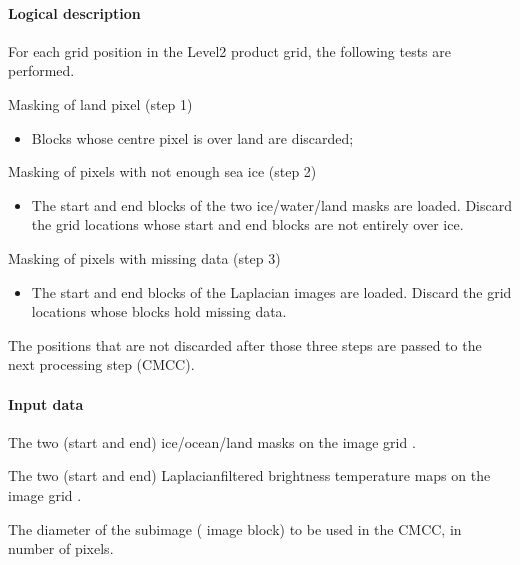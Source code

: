\documentclass[letterpaper,10pt,english]{jupyterBook}
\begin{document}
\paragraph{Logical description}
\label{\detokenize{baseline_algorithm_definition:logical-description}}
\sphinxAtStartPar
For each grid position in the Level\sphinxhyphen{}2 product grid, the following tests are performed.

\sphinxAtStartPar
Masking of land pixel (step 1)
\begin{itemize}
\item {} 
\sphinxAtStartPar
Blocks whose centre pixel is over land are discarded;

\end{itemize}

\sphinxAtStartPar
Masking of pixels with not enough sea ice (step 2)
\begin{itemize}
\item {} 
\sphinxAtStartPar
The start and end blocks of the two ice/water/land masks are loaded. Discard
the grid locations whose start and end blocks are not entirely over ice.

\end{itemize}

\sphinxAtStartPar
Masking of pixels with missing data (step 3)
\begin{itemize}
\item {} 
\sphinxAtStartPar
The start and end blocks of the Laplacian images are loaded.
Discard the grid locations whose blocks hold missing data.

\end{itemize}

\sphinxAtStartPar
The positions that are not discarded after those three steps are passed to the next processing step (CMCC).


\paragraph{Input data}
\label{\detokenize{baseline_algorithm_definition:id10}}
\sphinxAtStartPar
The two (start and end) ice/ocean/land masks on the image grid .

\sphinxAtStartPar
The two (start and end) Laplacian\sphinxhyphen{}filtered brightness temperature maps on the image grid .

\sphinxAtStartPar
The diameter of the sub\sphinxhyphen{}image ( image block) to be used in the CMCC, in number of pixels.
\end{document}
